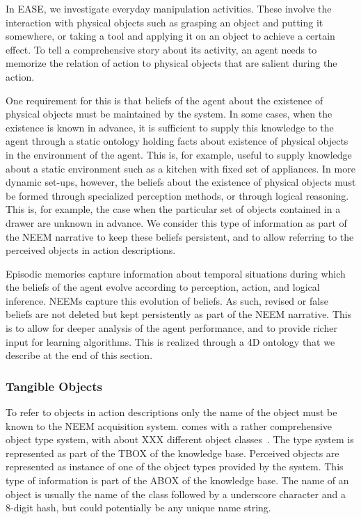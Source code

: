 
In EASE, we investigate everyday manipulation activities.
These involve the interaction with physical objects such as
grasping an object and putting it somewhere,
or taking a tool and applying it on an object to achieve a certain effect.
To tell a comprehensive story about its activity,
an agent needs to memorize the relation of action to
physical objects that are salient during the action.

One requirement for this is that beliefs of the agent about the existence
of physical objects must be maintained by the system.
In some cases, when the existence is known in advance,
it is sufficient to supply this knowledge to the agent through
a static ontology holding facts about existence of physical objects
in the environment of the agent.
This is, for example, useful to supply knowledge about a static
environment such as a kitchen with fixed set of appliances.
In more dynamic set-ups, however, the beliefs about the existence
of physical objects must be formed through specialized perception
methods, or through logical reasoning.
This is, for example, the case when the particular set of objects
contained in a drawer are unknown in advance.
We consider this type of information as part of the NEEM narrative
to keep these beliefs persistent, and to allow referring to
the perceived objects in action descriptions.

Episodic memories capture information about temporal situations
during which the beliefs of the agent evolve according to
perception, action, and logical inference.
NEEMs capture this evolution of beliefs.
As such, revised or false beliefs are not deleted but kept
persistently as part of the NEEM narrative.
This is to allow for deeper analysis of the agent performance,
and to provide richer input for learning algorithms.
This is realized through a 4D ontology that we describe at
the end of this section.

\subsubsection{Tangible Objects}
To refer to objects in action descriptions only the name of the 
object must be known to the NEEM acquisition system.
\knowrob comes with a rather comprehensive object type system,
with about XXX different object classes~\cite{knowrob-ontology}.
The type system is represented as part of the TBOX of the knowledge base.
Perceived objects are represented as instance of one of the object types
provided by the \knowrob system.
This type of information is part of the ABOX of the knowledge base.
The name of an object is usually the name of the class followed
by a underscore character and a 8-digit hash,
but could potentially be any unique name string.

